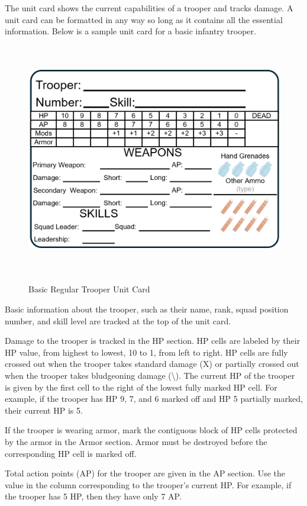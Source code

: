 The unit card shows the current capabilities of a trooper and tracks damage.
A unit card can be formatted in any way so long as it contains all the essential information.
Below is a sample unit card for a basic infantry trooper.

\begin{figure}[!h]
  \centering
  \includegraphics[alt='Sample Regular Trooper', width=5.63in, height=4in]{img/RegularTrooper.png}
  \caption*{Basic Regular Trooper Unit Card}
\end{figure}

Basic information about the trooper, such as their name, rank, squad position number, and skill level are tracked at the top of the unit card.

Damage to the trooper is tracked in the HP section.
HP cells are labeled by their HP value, from highest to lowest, 10 to 1, from left to right.
HP cells are fully crossed out when the trooper takes standard damage (X) or partially crossed out when the trooper takes bludgeoning damage (\textbackslash).
The current HP of the trooper is given by the first cell to the right of the lowest fully marked HP cell.
For example, if the trooper has HP 9, 7, and 6 marked off and HP 5 partially marked, their current HP is 5.

If the trooper is wearing armor, mark the contiguous block of HP cells protected by the armor in the Armor section.
Armor must be destroyed before the corresponding HP cell is marked off.

Total action points (AP) for the trooper are given in the AP section.
Use the value in the column corresponding to the trooper's current HP.
For example, if the trooper has 5 HP, then they have only 7 AP.

